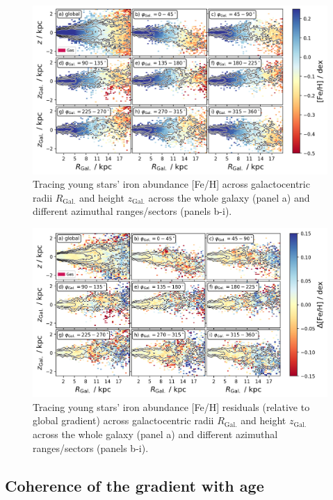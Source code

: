 \documentclass[fleqn,usenatbib]{mnras}
\begin{document}
\begin{figure}
    \centering
    \includegraphics[width=\columnwidth]{figures/tracing_fe_h_young_stars_in_angles.png}
    \caption{Tracing young stars' iron abundance [Fe/H] across galactocentric radii $R_\mathrm{Gal.}$ and height $z_\mathrm{Gal.}$ across the whole galaxy (panel a) and different azimuthal ranges/sectors (panels b-i).}
    \label{fig:tracing_fe_h_young_stars_in_angles}
\end{figure}

\begin{figure}
    \centering
    \includegraphics[width=\columnwidth]{figures/tracing_fe_h_residuals_young_stars_in_angles.png}
    \caption{Tracing young stars' iron abundance [Fe/H] residuals (relative to global gradient) across galactocentric radii $R_\mathrm{Gal.}$ and height $z_\mathrm{Gal.}$ across the whole galaxy (panel a) and different azimuthal ranges/sectors (panels b-i).}
    \label{fig:tracing_fe_h_residuals_young_stars_in_angles}
\end{figure}

\subsection{Coherence of the gradient with age}
\label{sec:coherence_age_radial_metallicity_gradients}
\end{document}
